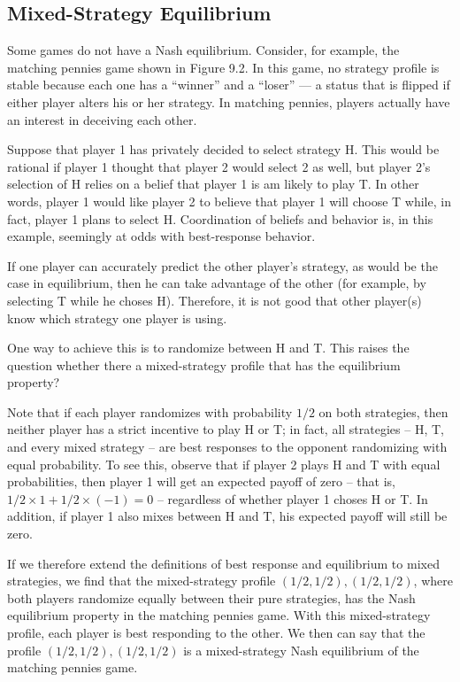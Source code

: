
\subsection{Mixed-Strategy Equilibrium}

Some games do not have a Nash equilibrium. Consider, for example, the matching pennies game shown in Figure 9.2. In this game, no strategy profile is stable because each one has a “winner” and a “loser” — a status that is flipped if either player alters his or her strategy. In matching pennies, players actually have an interest in deceiving each other. 

Suppose that player 1 has privately decided to select strategy H. This would be rational if player 1 thought that player 2 would select 2 as well, but player 2's selection of H relies on a belief that player 1 is am likely to play T. In other words, player 1 would like player 2 to believe that player 1 will choose T while, in fact, player 1 plans to select H. Coordination of beliefs and behavior is, in this example, seemingly at odds with best-response behavior.

If one player can accurately predict the other player's strategy, as would be the case in equilibrium, then he can take advantage of the other (for example, by selecting T while he choses H). Therefore, it is not good that other player(s) know which strategy one player is using.

One way to achieve this is to randomize between H and T. This raises the question whether there a mixed-strategy profile that has the equilibrium property?

Note that if each player randomizes with probability $1/2$ on both strategies, then neither player has a strict incentive to play H or T; in fact, all strategies -- H, T, and every mixed strategy -- are best responses to the opponent randomizing with equal probability. To see this, observe that if player 2 plays H and T with equal probabilities, then player 1 will get an expected payoff of zero -- that is, $1/2 \times 1 + 1/2 \times (-1) = 0$ -- regardless of whether player 1 choses H or T. In addition, if player 1 also mixes between H and T, his expected payoff will still be zero.

If we therefore extend the definitions of best response and equilibrium to mixed strategies, we find that the mixed-strategy profile $(1/2, 1/2), (1/2, 1/2)$, where both players randomize equally between their pure strategies, has the Nash equilibrium property in the matching pennies game. With this mixed-strategy profile, each player is best responding to the other. We then can say that the profile $(1/2, 1/2), (1/2, 1/2)$ is a mixed-strategy Nash equilibrium of the matching pennies game.

